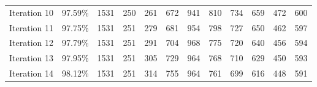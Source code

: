 \documentclass[jimaging,article,accept,pdftex,moreauthors]{Definitions/mdpi}
\begin{document}
\begin{table}[H]
\begin{tabularx}{\textwidth}{p{1.6cm}p{1.8cm}p{0.55cm}p{0.55cm}p{0.55cm}p{0.55cm}p{0.55cm}p{0.55cm}p{0.55cm}p{0.55cm}p{0.55cm}p{0.9cm}}
    Iteration 10 & 97.59\% & 1531   &     250    &    261    &    672   &     941&
        810     &   734    &    659   &     472  &      600 \\
    Iteration 11 & 97.75\% & 1531    &    251  &      279    &    681   &     954&
        798    &    727   &     650  &      462    &    597 \\
    Iteration 12 & 97.79\% & 1531   &     251   &     291   &     704    &    968&
        775   &     720     &   640   &     456     &   594\\
    Iteration 13 & 97.95\% & 1531 &       251   &     305    &    729   &     964 &
        768   &     710    &    629    &    450  &     593 \\
    Iteration 14 & 98.12\% & 1531   &     251    &    314     &   755 &     964&
        761   &     699   &     616    &    448   &     591 \\
\bottomrule
\end{tabularx}
 
  \label{tabB1}
\end{table}
\end{document}
